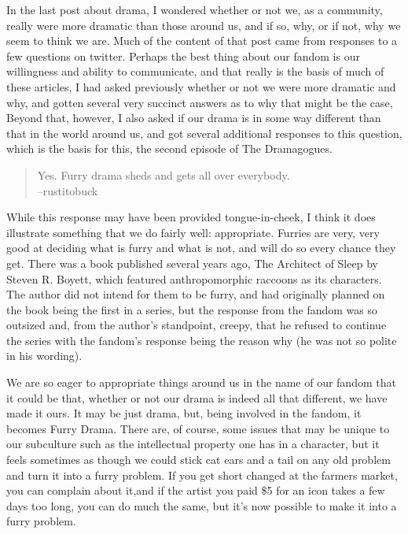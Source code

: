 
In the last post about drama, I wondered whether or not we, as a community, really were more dramatic than those around us, and if so, why, or if not, why we seem to think we are.  Much of the content of that post came from responses to a few questions on twitter. Perhaps the best thing about our fandom is our willingness and ability to communicate, and that really is the basis of much of these articles,  I had asked previously whether or not we were more dramatic and why, and gotten several very succinct answers as to why that might be the case, Beyond that, however, I also asked if our drama is in some way different than that in the world around us, and got several additional responses to this question, which is the basis for this, the second episode of The Dramagogues.

\begin{quote}
  Yes. Furry drama sheds and gets all over everybody.\\
  --rustitobuck
\end{quote}

While this response may have been provided tongue-in-cheek, I think it does illustrate something that we do fairly well: appropriate. Furries are very, very good at deciding what is furry and what is not, and will do so every chance they get. There was a book published several years ago, The Architect of Sleep by Steven R. Boyett, which featured anthropomorphic raccoons as its characters. The author did not intend for them to be furry, and had originally planned on the book being the first in a series, but the response from the fandom was so outsized and, from the author's standpoint, creepy, that he refused to continue the series with the fandom's response being the reason why (he was not so polite in his wording).

We are so eager to appropriate things around us in the name of our fandom that it could be that, whether or not our drama is indeed all that different, we have made it ours. It may be just drama, but, being involved in the fandom, it becomes Furry Drama. There are, of course, some issues that may be unique to our subculture such as the intellectual property one has in a character, but it feels sometimes as though we could stick cat ears and a tail on any old problem and turn it into a furry problem. If you get short changed at the farmers market, you can complain about it,and if the artist you paid \$5 for an icon takes a few days too long, you can do much the same, but it's now possible to make it into a furry problem.

